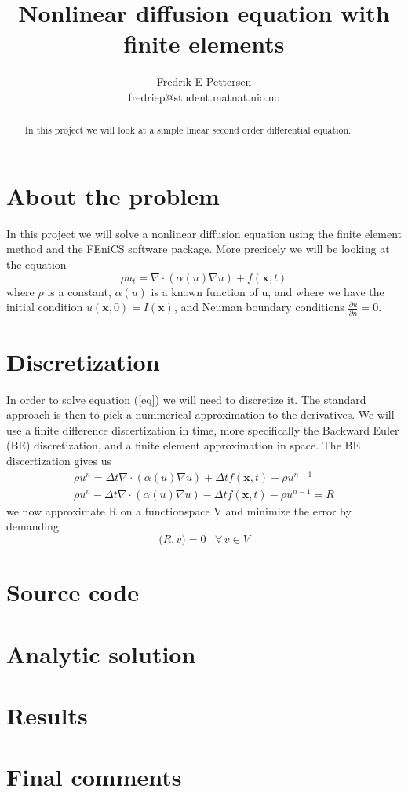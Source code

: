 \documentclass[a4paper,english, 10pt, twoside]{article}
\title{Nonlinear diffusion equation with finite elements}
\author{Fredrik E Pettersen\\ fredriep@student.matnat.uio.no}
\renewcommand{\d}{\partial}
\begin{document}
\maketitle

\begin{abstract}
In this project we will look at a simple linear second order differential equation.
\end{abstract}

\section*{About the problem}
In this project we will solve a nonlinear diffusion equation using the finite element method and the FEniCS software package.
More precicely we will be looking at the equation
\begin{equation}\label{eq}
 \rho u_t = \nabla\cdot(\alpha(u)\nabla u) +f(\mathbf{x},t)
\end{equation}
where $\rho$ is a constant, $\alpha(u)$ is a known function of u, and where we have the initial condition $u(\mathbf{x},0) = I(\mathbf{x})$, 
and Neuman boundary conditions $\frac{\d u}{\d n} = 0$.

\section*{Discretization}
In order to solve equation (\ref{eq}) we will need to discretize it. The standard approach is then to pick a nummerical approximation to the 
derivatives. We will use a finite difference discertization in time, more specifically the Backward Euler (BE) discretization, and a finite element 
approximation in space. The BE discertization gives us
\begin{align*}
 \rho u^n = \Delta t\nabla\cdot(\alpha(u)\nabla u) +\Delta t f(\mathbf{x},t) +\rho u^{n-1} \\
 \rho u^n - \Delta t\nabla\cdot(\alpha(u)\nabla u) -\Delta t f(\mathbf{x},t) -\rho u^{n-1} = R
\end{align*}
we now approximate R on a functionspace V and minimize the error by demanding
$$
\big(R,v\big) = 0 \;\;\; \forall \,v\in V
$$
\section*{Source code}

\section*{Analytic solution}

\section*{Results}

\section*{Final comments}
\end{document}
